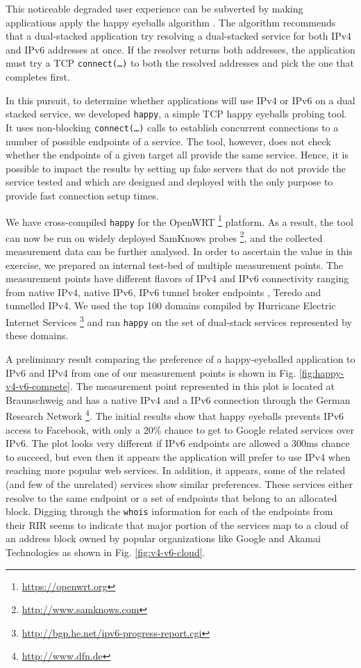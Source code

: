 This noticeable degraded user experience can be subverted by making
applications apply the happy eyeballs algorithm \cite{rfc6555}. The algorithm
recommends that a dual-stacked application try resolving a dual-stacked
service for both IPv4 and IPv6 addresses at once. If the resolver returns both
addresses, the application must try a TCP \texttt{connect(\ldots)} to both the
resolved addresses and pick the one that completes first.

In this pursuit, to determine whether applications will use IPv4 or IPv6 on a
dual stacked service, we developed \texttt{happy}, a simple TCP happy eyeballs
probing tool. It uses non-blocking \texttt{connect(\ldots)} calls to establish
concurrent connections to a number of possible endpoints of a service. The
tool, however, does not check whether the endpoints of a given target all
provide the same service. Hence, it is possible to impact the results by
setting up fake servers that do not provide the service tested and which are
designed and deployed with the only purpose to provide fast connection setup
times.

We have cross-compiled \texttt{happy} for the OpenWRT
\footnote{\url{https://openwrt.org}} platform. As a result, the tool can now
be run on widely deployed SamKnows probes
\footnote{\url{http://www.samknows.com}}, and the collected measurement data
can be further analysed. In order to ascertain the value in this exercise, we
prepared an internal test-bed of multiple measurement points. The measurement
points have different flavors of IPv4 and IPv6 connectivity ranging from
native IPv4, native IPv6, IPv6 tunnel broker endpoints \cite{rfc3053}, Teredo
\cite{rfc4380} and tunnelled IPv4. We used the top 100 domains compiled by
Hurricane Electric Internet Services
\footnote{\url{http://bgp.he.net/ipv6-progress-report.cgi}} and ran
\texttt{happy} on the set of dual-stack services represented by these domains.

A preliminary result comparing the preference of a happy-eyeballed application
to IPv6 and IPv4 from one of our measurement points is shown in Fig.
\ref{fig:happy-v4-v6-compete}. The measurement point represented in this plot
is located at Braunschweig and has a native IPv4 and a IPv6 connection through
the German Research Network \footnote{\url{http://www.dfn.de}}. The initial
results show that happy eyeballs prevents IPv6 access to Facebook, with only a
20\% chance to get to Google related services over IPv6. The plot looks very
different if IPv6 endpoints are allowed a 300ms chance to succeed, but even
then it appears the application will prefer to use IPv4 when reaching more
popular web services. In addition, it appears, some of the related (and few of
the unrelated) services show similar preferences. These services either
resolve to the same endpoint or a set of endpoints that belong to an allocated
block.  Digging through the \texttt{whois} information for each of the
endpoints from their \ac{RIR} seems to indicate that major portion of the
services map to a cloud of an address block owned by popular organizations
like Google and Akamai Technologies as shown in Fig.  \ref{fig:v4-v6-cloud}.

